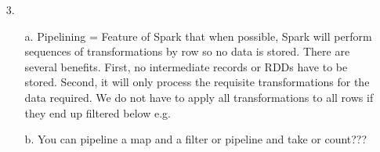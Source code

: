 \documentclass{article}
\begin{document}
\begin{itemize}
\begin{itemize}
	\end{itemize}
	
\pagebreak
\vspace{2cm}
\item[3.]
	\begin{itemize}
		\item[a.] Pipelining = Feature of Spark that when possible, Spark will perform sequences of transformations by row so no data is stored. There are several benefits. First, no intermediate records or RDDs have to be stored. Second, it will only process the requisite transformations for the data required. We do not have to apply all transformations to all rows if they end up filtered below e.g. 
		\item[b.] You can pipeline a map and a filter or pipeline and take or count???
	\end{itemize}

\end{itemize}
\end{document}
